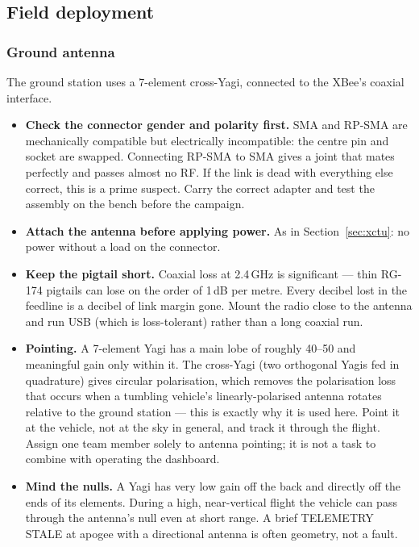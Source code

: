 \documentclass[11pt,a4paper]{article}
\begin{document}
\subsection{Field deployment}
\label{sec:field}

\subsubsection{Ground antenna}

The ground station uses a 7-element cross-Yagi, connected to the XBee's
coaxial interface.

\begin{itemize}
  \item \textbf{Check the connector gender and polarity first.} SMA and
        RP-SMA are mechanically compatible but electrically incompatible: the
        centre pin and socket are swapped. Connecting RP-SMA to SMA gives a
        joint that mates perfectly and passes almost no RF. If the link is
        dead with everything else correct, this is a prime suspect. Carry the
        correct adapter and test the assembly on the bench before the
        campaign.
  \item \textbf{Attach the antenna before applying power.} As in
        Section~\ref{sec:xctu}: no power without a load on the connector.
  \item \textbf{Keep the pigtail short.} Coaxial loss at 2.4\,GHz is
        significant --- thin RG-174 pigtails can lose on the order of
        1\,dB per metre. Every decibel lost in the feedline is a decibel of
        link margin gone. Mount the radio close to the antenna and run USB
        (which is loss-tolerant) rather than a long coaxial run.
  \item \textbf{Pointing.} A 7-element Yagi has a main lobe of roughly
        40--50\textdegree{} and meaningful gain only within it. The
        cross-Yagi (two orthogonal Yagis fed in quadrature) gives circular
        polarisation, which removes the polarisation loss that occurs when
        a tumbling vehicle's linearly-polarised antenna rotates relative to
        the ground station --- this is exactly why it is used here. Point it
        at the vehicle, not at the sky in general, and track it through the
        flight. Assign one team member solely to antenna pointing; it is not
        a task to combine with operating the dashboard.
  \item \textbf{Mind the nulls.} A Yagi has very low gain off the back and
        directly off the ends of its elements. During a high, near-vertical
        flight the vehicle can pass through the antenna's null even at short
        range. A brief \textsf{TELEMETRY STALE} at apogee with a directional
        antenna is often geometry, not a fault.
\end{itemize}
\end{document}

